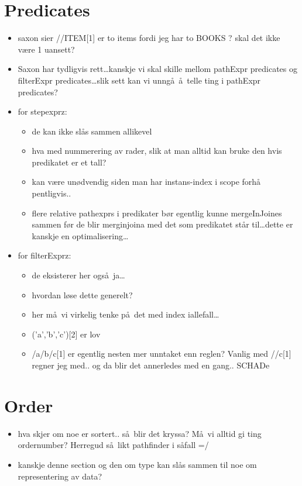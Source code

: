 


\section{Predicates}
\label{sect:discussion:predicates}
\begin{itemize}
  \item saxon sier //ITEM[1] er to items fordi jeg har to BOOKS ? skal det ikke
  v\ae re 1 uansett?
  \item Saxon har tydligvis rett\ldots kanskje vi skal skille mellom pathExpr predicates og filterExpr
  predicates\ldots slik sett kan vi unng\aa~\aa~telle ting i pathExpr predicates?
  \item for stepexprz: 

	\begin{itemize}
	  \item de kan ikke sl\aa s sammen allikevel
	  \item hva med nummerering av rader, slik at man alltid kan bruke den hvis
	  predikatet er et tall?
	  \item kan v\ae re un\o dvendig siden man har instans-index i scope forh\aa
	  pentligvis..
	  \item flere relative pathexprs i predikater b\o r egentlig kunne mergeInJoines sammen f\o r de blir merginjoina
	  med det som predikatet st\aa r til\ldots dette er kanskje en optimalisering\ldots
    \end{itemize}
  \item for filterExprz:
  	\begin{itemize}
	  \item de eksisterer her ogs\aa~ja\ldots
	  \item hvordan l\o se dette generelt?
	  \item her m\aa~vi virkelig tenke p\aa~det med index iallefall\ldots 
	  \item ('a','b','c')[2] er lov
	  \item /a/b/c[1] er egentlig nesten mer unntaket enn reglen? Vanlig med
	  //c[1] regner jeg med.. og da blir det annerledes med en gang.. SCHADe
    \end{itemize} 
\end{itemize}

\section{Order}
\label{sect:discussion:order}
\begin{itemize}
  \item hva skjer om noe er sortert.. s\aa~blir det kryssa? M\aa~vi alltid gi ting ordernumber? Herregud s\aa~likt
  pathfinder i s\aa fall =/
  \item kanskje denne section og den om type kan sl\aa s sammen til noe om representering av data?
\end{itemize}

